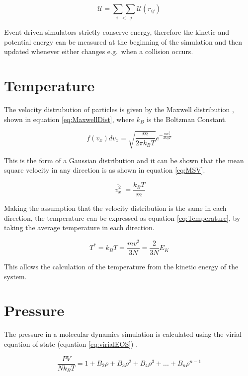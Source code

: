 \documentclass[12pt]{UoAthesis}
\begin{document}
\begin{equation}
  \label{eq:totalU}
  \mathcal{U} = \underset{i\;\;<\;\;j}{\sum\sum}\mathcal{U}(r_{ij})
\end{equation}

Event-driven simulators strictly conserve energy, therefore the
kinetic and potential energy can be measured at the beginning of the
simulation and then updated whenever either changes e.g.\ when a
collision occurs.

\section{Temperature}

The velocity distrubution of particles is given by the Maxwell
distribution \cite{Haile1997}, shown in equation
\eqref{eq:MaxwellDist}, where $k_B$ is the Boltzman Constant.

\begin{equation}
  \label{eq:MaxwellDist}
  f(v_x)dv_x = \sqrt{\frac{m}{2\pi k_BT}}e^{-\frac{mv_x^2}{2k_BT}} 
\end{equation}

This is the form of a Gaussian distribution and it can be shown
\cite{Landau1968} that the mean square velocity in any direction is as
shown in equation \eqref{eq:MSV}.

\begin{equation}
  \label{eq:MSV}
  \bar{\;v_x^2\;} = \frac{k_BT}{m}
\end{equation}

Making the assumption that the velocity distribution is the same in
each direction, the temperature can be expressed as equation
\eqref{eq:Temperature}, by taking the average temperature in each
direction. 

\begin{equation}
\label{eq:Temperature}
  T^* = k_BT = \frac{mv^2}{3N} = \frac{2}{3N}E_K
\end{equation}

This allows the calculation of the temperature from the kinetic energy
of the system.
\section{Pressure}

The pressure in a molecular dynamics simulation is calculated using
the virial equation of state (equation \eqref{eq:virialEOS}) \cite{Landau1968}.

\begin{equation}
  \label{eq:virialEOS}
  \frac{PV}{Nk_BT} = 1 + B_2\rho + B_3\rho^2 + B_4\rho^3 + ... + B_{n}\rho^{n-1}
\end{equation}
\end{document}
